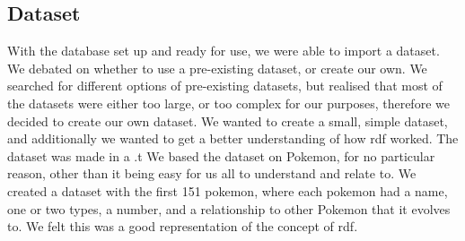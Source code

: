 \subsection{Dataset}\label{sec:dataset}
With the database set up and ready for use, we were able to import a dataset. We debated on whether to use a pre-existing dataset, or create our own. We searched for different options of pre-existing datasets, but realised that most of the datasets were either too large, or too complex for our purposes, therefore we decided to create our own dataset. We wanted to create a small, simple dataset, and additionally we wanted to get a better understanding of how \gls{rdf} worked. The dataset was made in a .t
We based the dataset on Pokemon, for no particular reason, other than it being easy for us all to understand and relate to. We created a dataset with the first 151 pokemon, where each pokemon had a name, one or two types, a number, and a relationship to other Pokemon that it evolves to. We felt this was a good representation of the concept of \gls{rdf}.






